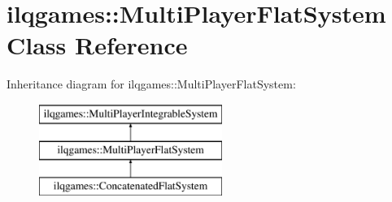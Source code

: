 \hypertarget{classilqgames_1_1_multi_player_flat_system}{}\section{ilqgames\+:\+:Multi\+Player\+Flat\+System Class Reference}
\label{classilqgames_1_1_multi_player_flat_system}
Inheritance diagram for ilqgames\+:\+:Multi\+Player\+Flat\+System\+:\begin{figure}[H]
\begin{center}
\leavevmode
\includegraphics[height=3.000000cm]{classilqgames_1_1_multi_player_flat_system}
\end{center}
\end{figure}
